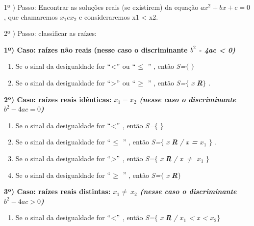 \begin{caixa}

1º ) Passo: Encontrar as soluções reais (se existirem) da equação $ax^{2} + bx + c = 0$, que chamaremos $x_{1} e  x_{2}$ e consideraremos x1 < x2.

2º ) Passo: classificar as raízes:

\textbf{1º) Caso: raízes não reais (nesse caso o discriminante \textit{$b^{2}$ - 4ac < 0) }}

\begin{enumerate}
	\item Se o sinal da desigualdade for $``$<$"$  ou $``$\textit{$ \leq $ }$"$ , então \textit{S=}$ \{ $ $ \} $ 

	\item Se o sinal da desigualdade for $``$>$"$  ou $``$$ \geq $ $"$ , então \textit{S=}$ \{ $ \textit{x } \textbf{\textit{R}}$ \} $ \textit{.}
\end{enumerate}

\textbf{2º) Caso: raízes reais idênticas: \textit{$x_{1} = x_{2}$ (nesse caso o discriminante $b^{2} - 4ac  = 0$) }}

\begin{enumerate}
	\item Se o sinal da desigualdade for $``$<$"$ , então \textit{S=}$ \{ $ $ \} $ 

	\item Se o sinal da desigualdade for $``$\textit{$ \leq $ }$"$ , então \textit{S=}$ \{ $ \textit{x } \textbf{\textit{R }}\textit{/ x\textbf{ = }$x_{1}$} $ \} $ \textit{.}

	\item \textit{ }Se o sinal da desigualdade for $``$\textit{>}$"$ , então \textit{S=}$ \{ $ \textit{x } \textbf{\textit{R }}\textit{/ x\textbf{ $ \neq $  }$x_{1}$} $ \} $ 

	\item  Se o sinal da desigualdade for $``$\textit{$ \geq $ }$"$ , então \textit{S=}$ \{ $ \textit{x } \textbf{\textit{R}}$ \} $ 
\end{enumerate}

\textbf{3º) Caso: raízes reais distintas: \textit{$x_{1} \neq ~ x_{2}$ (nesse caso o discriminante $b^{2} - 4ac > 0$) }}

\begin{enumerate}
	\item Se o sinal da desigualdade for $``$<$"$ , então \textit{S=}$ \{ $ \textit{x } \textbf{\textit{R }}\textit{/ $x_{1}$ < x < $x_{2}$}$ \} $ 


\end{enumerate}
\end{caixa}

